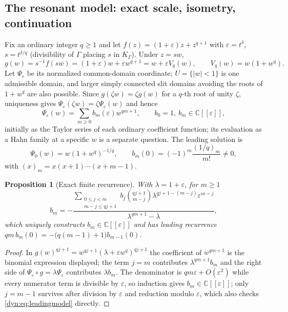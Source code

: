 \documentclass[11pt,letterpaper]{article}
\newtheorem{proposition}[proposition]{Proposition}
\theoremstyle{definition}
\theoremstyle{remark}
\newcommand{\C}{\mathbb C}
\newcommand{\eps}{\varepsilon}
\numberwithin{equation}{section}
\begin{document}
\subsection{The resonant model: exact scale, isometry, continuation}
Fix an ordinary integer $q\ge1$ and let
$f(z)=(1+\eps)z+z^{q+1}$ with $\eps=t^{\delta}$, $s=t^{\delta/q}$
(divisibility of $\Gamma$ placing $s$ in $K_\Gamma$). Under $z=sw$,
\begin{equation}\label{dyn:eq:gmodel}
 g(w)=s^{-1}f(sw)=(1+\eps)w+\eps w^{q+1}=w+\eps V_q(w),
 \qquad V_q(w)=w(1+w^{q}).
\end{equation}
Let $\Psi_\eps$ be its normalized common-domain coordinate; $U=\{|w|<1\}$
is one admissible domain, and larger simply connected slit domains avoiding
the roots of $1+w^{q}$ are also possible. Since $g(\zeta w)=\zeta g(w)$ for
a $q$-th root of unity $\zeta$, uniqueness gives
$\Psi_\eps(\zeta w)=\zeta\Psi_\eps(w)$ and hence
\begin{equation}\label{dyn:eq:bseries}
 \Psi_\eps(w)=\sum_{m\ge0}b_m(\eps)w^{qm+1},\qquad b_0=1,\ b_m\in\C[[\eps]],
\end{equation}
initially as the Taylor series of each ordinary coefficient function; its
evaluation as a Hahn family at a specific $w$ is a separate question. The
leading solution is
\begin{equation}\label{dyn:eq:leadingmodel}
 \Psi_0(w)=w(1+w^{q})^{-1/q},\qquad
 b_m(0)=(-1)^{m}\frac{(1/q)_m}{m!}\ne0 ,
\end{equation}
with $(x)_m=x(x+1)\cdots(x+m-1)$.

\begin{proposition}[Exact finite recurrence]\label{dyn:prop:recurrence}
With $\lambda=1+\eps$, for $m\ge1$
\begin{equation}\label{dyn:eq:brecurrence}
 b_m=-\frac{\displaystyle\sum_{\substack{0\le j<m\\ m-j\le qj+1}}
 b_j\binom{qj+1}{m-j}\lambda^{qj+1-(m-j)}\eps^{m-j}}
 {\lambda^{qm+1}-\lambda},
\end{equation}
which uniquely constructs $b_m\in\C[[\eps]]$ and has leading recurrence
$qm\,b_m(0)=-\bigl(q(m-1)+1\bigr)b_{m-1}(0)$.
\end{proposition}
\begin{proof}
In $g(w)^{qj+1}=w^{qj+1}(\lambda+\eps w^{q})^{qj+1}$ the coefficient of
$w^{qm+1}$ is the binomial expression displayed; the term $j=m$ contributes
$\lambda^{qm+1}b_m$ and the right side of
$\Psi_\eps\circ g=\lambda\Psi_\eps$ contributes $\lambda b_m$. The
denominator is $qm\eps+O(\eps^{2})$ while every numerator term is divisible
by $\eps$, so induction gives $b_m\in\C[[\eps]]$; only $j=m-1$ survives
after division by $\eps$ and reduction modulo $\eps$, which also checks
\eqref{dyn:eq:leadingmodel} directly.
\end{proof}
\end{document}
